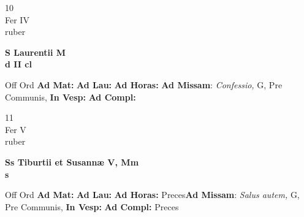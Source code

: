 \documentclass[10pt, openany]{book}
\begin{document}
        \begin{center}
            \begin{minipage}{3.5in}
                \vspace{2em}
                \begin{minipage}{0.5in}
                    {\Huge 10} \\
                    {\normalsize Fer IV} \\
                    {\normalsize ruber}
                \end{minipage}
                \begin{minipage}{3.0in}
                    \textbf{ \large S Laurentii M \\
                    \textnormal{\normalsize d II cl}} \\ 
                \end{minipage}
                \begin{justify}Off Ord
                    \textbf{Ad Mat: }
                    \textbf{Ad Lau: }
                    \textbf{Ad Horas: }\textbf{Ad Missam}: \textit{Confessio,} G, Pre Communis,  
                    \textbf{In Vesp: }
                    \textbf{Ad Compl: }
                \end{justify}
            \end{minipage}
        \end{center}
    
        \begin{center}
            \begin{minipage}{3.5in}
                \vspace{2em}
                \begin{minipage}{0.5in}
                    {\Huge 11} \\
                    {\normalsize Fer V} \\
                    {\normalsize ruber}
                \end{minipage}
                \begin{minipage}{3.0in}
                    \textbf{ \large Ss Tiburtii et Susannæ V, Mm \\
                    \textnormal{\normalsize s}} \\ 
                \end{minipage}
                \begin{justify}Off Ord
                    \textbf{Ad Mat: }
                    \textbf{Ad Lau: }
                    \textbf{Ad Horas: }Preces\textbf{Ad Missam}: \textit{Salus autem,} G, Pre Communis,  
                    \textbf{In Vesp: }
                    \textbf{Ad Compl: }Preces
                \end{justify}
            \end{minipage}
        \end{center}
    
\end{document}
